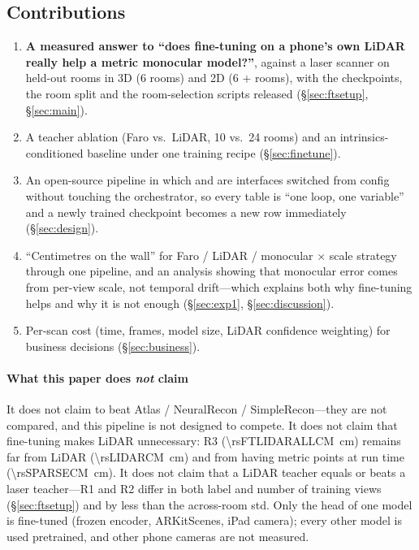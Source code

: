 \subsection{Contributions}
\begin{enumerate}
\item \textbf{A measured answer to ``does fine-tuning on a phone's own LiDAR really help a metric monocular model?''},
against a laser scanner on held-out rooms in 3D (6 rooms) and 2D (6 $+$ \rsVN{} rooms), with the checkpoints, the room
split and the room-selection scripts released (\S\ref{sec:ftsetup}, \S\ref{sec:main}).
\item A teacher ablation (Faro vs.\ LiDAR, 10 vs.\ 24 rooms) and an intrinsics-conditioned baseline under one training
recipe (\S\ref{sec:finetune}).
\item An open-source pipeline in which  and  are interfaces switched from config
without touching the orchestrator, so every table is ``one loop, one variable'' and a newly trained checkpoint becomes
a new row immediately (\S\ref{sec:design}).
\item ``Centimetres on the wall'' for Faro / LiDAR / monocular $\times$ scale strategy through one pipeline, and an
analysis showing that monocular error comes from per-view scale, not temporal drift---which explains both why
fine-tuning helps and why it is not enough (\S\ref{sec:exp1}, \S\ref{sec:discussion}).
\item Per-scan cost (time, frames, model size, LiDAR confidence weighting) for business decisions (\S\ref{sec:business}).
\end{enumerate}

\paragraph{What this paper does \emph{not} claim}
It does not claim to beat Atlas / NeuralRecon / SimpleRecon---they are not compared, and this pipeline is not designed to
compete. It does not claim that fine-tuning makes LiDAR unnecessary: R3 (\SI{\rsFTLIDARALLCM}{cm}) remains far from
LiDAR (\SI{\rsLIDARCM}{cm}) and from having metric points at run time (\SI{\rsSPARSECM}{cm}). It does not claim that a
LiDAR teacher equals or beats a laser teacher---R1 and R2 differ in both label and number of training views
(\S\ref{sec:ftsetup}) and by less than the across-room std. Only the head of one model is fine-tuned (frozen encoder,
ARKitScenes, iPad camera); every other model is used pretrained, and other phone cameras are not measured.
